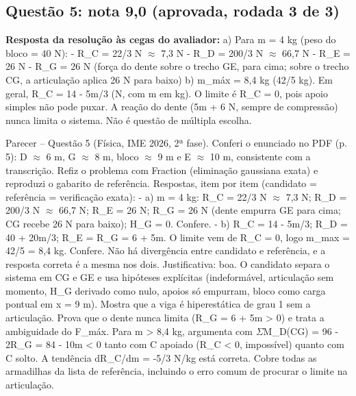 \documentclass{article}%
\begin{document}
\subsection*{Questão 5: nota 9,0 (aprovada, rodada 3 de 3)}%
\textbf{Resposta da resolução às cegas do avaliador:} a) Para m = 4 kg (peso do bloco = 40 N):\newline%
{-} R\_C = 22/3 N $\approx$ 7,3 N\newline%
{-} R\_D = 200/3 N $\approx$ 66,7 N\newline%
{-} R\_E = 26 N\newline%
{-} R\_G = 26 N (força do dente sobre o trecho GE, para cima; sobre o trecho CG, a articulação aplica 26 N para baixo)\newline%
\newline%
b) m\_máx = 8,4 kg (42/5 kg). Em geral, R\_C = 14 - 5m/3 (N, com m em kg). O limite é R\_C = 0, pois apoio simples não pode puxar. A reação do dente (5m + 6 N, sempre de compressão) nunca limita o sistema.\newline%
\newline%
Não é questão de múltipla escolha.\par %
Parecer -- Questão 5 (Física, IME 2026, 2ª fase). Conferi o enunciado no PDF (p. 5): D $\approx$ 6 m, G $\approx$ 8 m, bloco $\approx$ 9 m e E $\approx$ 10 m, consistente com a transcrição. Refiz o problema com Fraction (eliminação gaussiana exata) e reproduzi o gabarito de referência.\newline%
\newline%
Respostas, item por item (candidato = referência = verificação exata):\newline%
{-} a) m = 4 kg: R\_C = 22/3 N $\approx$ 7,3 N; R\_D = 200/3 N $\approx$ 66,7 N; R\_E = 26 N; R\_G = 26 N (dente empurra GE para cima; CG recebe 26 N para baixo); H\_G = 0. Confere.\newline%
{-} b) R\_C = 14 - 5m/3; R\_D = 40 + 20m/3; R\_E = R\_G = 6 + 5m. O limite vem de R\_C = 0, logo m\_max = 42/5 = 8,4 kg. Confere.\newline%
\newline%
Não há divergência entre candidato e referência, e a resposta correta é a mesma nos dois.\newline%
\newline%
Justificativa: boa. O candidato separa o sistema em CG e GE e usa hipóteses explícitas (indeformável, articulação sem momento, H\_G derivado como nulo, apoios só empurram, bloco como carga pontual em x = 9 m). Mostra que a viga é hiperestática de grau 1 sem a articulação. Prova que o dente nunca limita (R\_G = 6 + 5m > 0) e trata a ambiguidade do F\_máx. Para m > 8,4 kg, argumenta com $\Sigma$M\_D(CG) = 96 - 2R\_G = 84 - 10m < 0 tanto com C apoiado (R\_C < 0, impossível) quanto com C solto. A tendência dR\_C/dm = -5/3 N/kg está correta. Cobre todas as armadilhas da lista de referência, incluindo o erro comum de procurar o limite na articulação.\newline%
\end{document}
